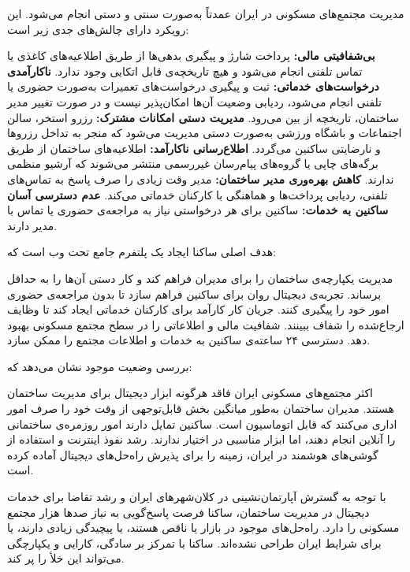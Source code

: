


مدیریت مجتمع‌های مسکونی در ایران عمدتاً به‌صورت سنتی و دستی انجام می‌شود.
این رویکرد دارای چالش‌های جدی زیر است:

 \textbf{بی‌شفافیتی مالی:} پرداخت شارژ و پیگیری بدهی‌ها از طریق اطلاعیه‌های کاغذی یا تماس تلفنی انجام می‌شود و هیچ تاریخچه‌ی قابل اتکایی وجود ندارد.
 \textbf{ناکارآمدی درخواست‌های خدماتی:} ثبت و پیگیری درخواست‌های تعمیرات به‌صورت حضوری یا تلفنی انجام می‌شود، ردیابی وضعیت آن‌ها امکان‌پذیر نیست و در صورت تغییر مدیر ساختمان، تاریخچه از بین می‌رود.
 \textbf{مدیریت دستی امکانات مشترک:} رزرو استخر، سالن اجتماعات و باشگاه ورزشی به‌صورت دستی مدیریت می‌شود که منجر به تداخل رزروها و نارضایتی ساکنین می‌گردد.
 \textbf{اطلاع‌رسانی ناکارآمد:} اطلاعیه‌های ساختمان از طریق برگه‌های چاپی یا گروه‌های پیام‌رسان غیررسمی منتشر می‌شوند که آرشیو منظمی ندارند.
 \textbf{کاهش بهره‌وری مدیر ساختمان:} مدیر وقت زیادی را صرف پاسخ به تماس‌های تلفنی، ردیابی پرداخت‌ها و هماهنگی با کارکنان خدماتی می‌کند.
 \textbf{عدم دسترسی آسان ساکنین به خدمات:} ساکنین برای هر درخواستی نیاز به مراجعه‌ی حضوری یا تماس با مدیر دارند.


هدف اصلی ساکنا ایجاد یک پلتفرم جامع تحت وب است که:

 مدیریت یکپارچه‌ی ساختمان را برای مدیران فراهم کند و کار دستی آن‌ها را به حداقل برساند.
 تجربه‌ی دیجیتال روان برای ساکنین فراهم سازد تا بدون مراجعه‌ی حضوری امور خود را پیگیری کنند.
 جریان کار کارآمد برای کارکنان خدماتی ایجاد کند تا وظایف ارجاع‌شده را شفاف ببینند.
 شفافیت مالی و اطلاعاتی را در سطح مجتمع مسکونی بهبود دهد.
 دسترسی ۲۴ ساعته‌ی ساکنین به خدمات و اطلاعات مجتمع را ممکن سازد.


بررسی وضعیت موجود نشان می‌دهد که:

 اکثر مجتمع‌های مسکونی ایران فاقد هرگونه ابزار دیجیتال برای مدیریت ساختمان هستند.
 مدیران ساختمان به‌طور میانگین بخش قابل‌توجهی از وقت خود را صرف امور اداری می‌کنند که قابل اتوماسیون است.
 ساکنین تمایل دارند امور روزمره‌ی ساختمانی را آنلاین انجام دهند، اما ابزار مناسبی در اختیار ندارند.
 رشد نفوذ اینترنت و استفاده از گوشی‌های هوشمند در ایران، زمینه را برای پذیرش راه‌حل‌های دیجیتال آماده کرده است.


با توجه به گسترش آپارتمان‌نشینی در کلان‌شهرهای ایران و رشد تقاضا برای خدمات دیجیتال در مدیریت ساختمان،
ساکنا فرصت پاسخ‌گویی به نیاز صدها هزار مجتمع مسکونی را دارد.
راه‌حل‌های موجود در بازار یا ناقص هستند، یا پیچیدگی زیادی دارند، یا برای شرایط ایران طراحی نشده‌اند.
ساکنا با تمرکز بر سادگی، کارایی و یکپارچگی می‌تواند این خلأ را پر کند.

